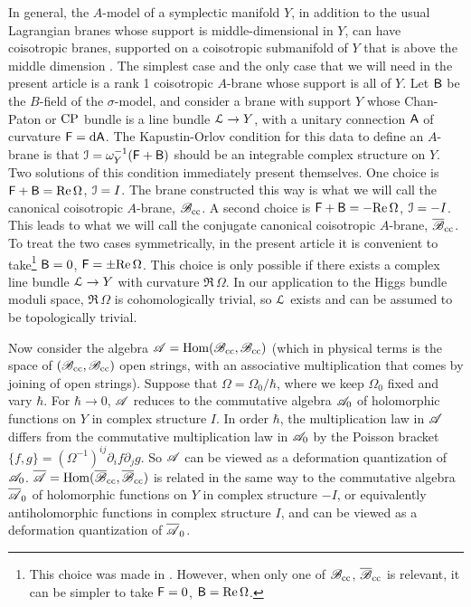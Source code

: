 \documentclass[11pt,a4paper]{article}
\begin{document}
In general, the $A$-model of a symplectic manifold $Y$, in addition to the usual Lagrangian branes whose support is middle-dimensional in $Y$,
can have coisotropic branes, supported on a coisotropic  submanifold of $Y$ that is above the middle dimension \cite{KO}.    The simplest case and the only
case that we will need in the present article is a rank 1 coisotropic $A$-brane whose support is all of $Y$.   Let ${\sf B}$ be the $B$-field of the $\sigma$-model,
and consider a brane with support $Y$ whose Chan-Paton or ${\mathrm{CP}}$ bundle is a  line bundle ${\mathcal L}\to Y$, with a unitary connection ${\sf A}$ of curvature ${\sf F}=\mathrm d{\sf A}$.  
The Kapustin-Orlov condition
for this data to define an $A$-brane is  that ${\mathcal I}=\omega_Y^{-1}({\sf F}+{\sf B})$ should be an integrable complex structure on $Y$.   Two solutions
of this condition immediately present themselves.    One choice is ${\sf F}+{\sf B}={\mathrm{Re}}\,\Omega$, ${\mathcal I}=I$.   The brane constructed this way is what we will call
the canonical coisotropic $A$-brane, ${\mathscr B}_{\mathrm{cc}}$.  A second choice is ${\sf F}+{\sf B}=-{\mathrm{Re}}\,\Omega$, ${\mathcal I}=-I$.    This leads to what we will call the conjugate
canonical coisotropic $A$-brane, ${\overline {\mathscr B}}_{\mathrm{cc}}$.    To treat the two cases symmetrically, in the present article it is convenient to take\footnote{This choice was made
in \cite{GuW}.   However, when only one of ${\mathscr B}_{\mathrm{cc}}$, ${\overline {\mathscr B}}_{\mathrm{cc}}$ is relevant, it can be simpler to take ${\sf F}=0$, ${\sf B}={\mathrm{Re}}\,\Omega$.}
 ${\sf B}=0$, ${\sf F}=\pm {\mathrm{Re}}\,\Omega$.   This choice is only possible if there exists a complex line bundle ${\mathcal L}\to Y$ with curvature $\Re\,\Omega$.   In our
 application to the Higgs bundle moduli space, $\Re\,\Omega$ is cohomologically trivial, so ${\mathcal L}$ exists and can  be assumed to be topologically trivial. 
 
Now consider the algebra ${\mathscr A}={\mathrm{Hom}}({\mathscr B}_{\mathrm{cc}},{\mathscr B}_{\mathrm{cc}})$ (which in physical terms is the space of $({\mathscr B}_{\mathrm{cc}},{\mathscr B}_{\mathrm{cc}})$ open strings, with an associative
multiplication that comes by joining of open strings).    Suppose that $\Omega=\Omega_0/\hbar$, where we keep $\Omega_0$ fixed and vary $\hbar$.
For $\hbar\to 0$, ${\mathscr A}$ reduces to the commutative algebra ${\mathscr A}_0$ of holomorphic functions on $Y$ in complex structure $I$.   In order $\hbar$,
the multiplication law in ${\mathscr A}$ differs from the commutative multiplication law in ${\mathscr A}_0$ by the Poisson bracket $\{f,g\}=(\Omega^{-1})^{ij}\partial_i f\partial_j g$.
So ${\mathscr A}$ can be viewed as a deformation quantization of ${\mathscr A}_0$.   $\overline{\mathscr A}={\mathrm{Hom}}({\overline {\mathscr B}}_{\mathrm{cc}},{\overline {\mathscr B}}_{\mathrm{cc}})$ is  related in the same way to the commutative algebra $\overline{\mathscr A}_0$
of holomorphic functions on $Y$ in complex structure $-I$, or equivalently antiholomorphic functions in complex structure $I$, and can be viewed as a deformation
quantization of $\overline{\mathscr A}_0$.   
\end{document}
